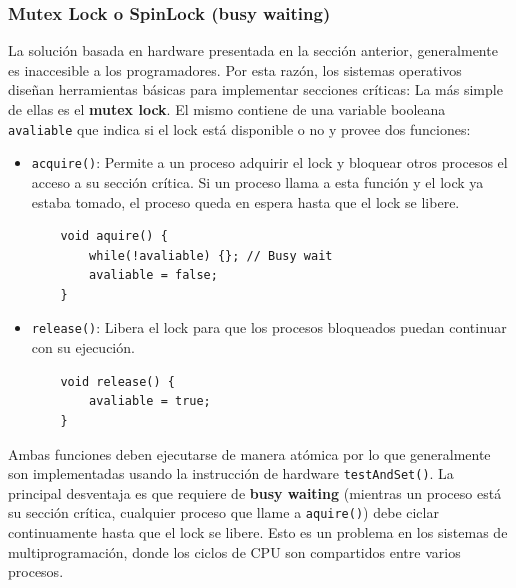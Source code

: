 \subsubsection{Mutex Lock o SpinLock (busy waiting)} 
La solución basada en hardware presentada en la sección anterior, generalmente es inaccesible a los programadores. Por esta razón, los sistemas operativos diseñan herramientas básicas para implementar secciones críticas: La más simple de ellas es el \textbf{mutex lock}. El mismo contiene de una variable booleana \texttt{avaliable} que indica si el lock está disponible o no y provee dos funciones: 

\begin{itemize}
\item \texttt{acquire()}: Permite a un proceso adquirir el lock y bloquear otros procesos el acceso a su sección crítica. Si un proceso llama a esta función y el lock ya estaba tomado, el proceso queda en espera hasta que el lock se libere.

\begin{verbatim}
	void aquire() {
		while(!avaliable) {}; // Busy wait
		avaliable = false;	
	}
\end{verbatim}
\item \texttt{release()}: Libera el lock para que los procesos bloqueados puedan continuar con su ejecución.
\begin{verbatim}
	void release() {
		avaliable = true;	
	}
\end{verbatim}
\end{itemize}

Ambas funciones deben ejecutarse de manera atómica por lo que generalmente son implementadas usando la instrucción de hardware \texttt{testAndSet()}. La principal desventaja es que requiere de \textbf{busy waiting} (mientras un proceso está su sección crítica, cualquier proceso que llame a \texttt{aquire()}) debe ciclar continuamente hasta que el lock se libere. Esto es un problema en los sistemas de multiprogramación, donde los ciclos de CPU son compartidos entre varios procesos.

